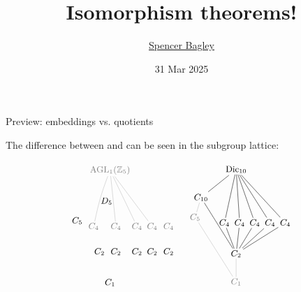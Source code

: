 \documentclass[8pt, handout]{beamer}
\title[Isomorphism theorems!]{Isomorphism theorems!}
\author[\href{mailto:sbagley@westminsteru.edu}{S. Bagley}]
       {\href{mailto:sbagley@westminsteru.edu}{Spencer Bagley}}
\institute[Westminster] { 
  \normalsize With many thanks to Matthew Macauley, \\
  \url{http://www.math.clemson.edu/~macaule/}}
\date[31 Mar 2025]{31 Mar 2025}
\newcommand{\Pause}{}      %
\begin{document}
\frame{\titlepage}


\begin{frame}{Preview: embeddings vs. quotients} %

  The difference between  and  can be seen in the subgroup lattice:
  
  \vspace{-2mm}

  \[
  \begin{tikzpicture}[shorten >= -2pt, shorten <= -2pt,scale=.65]
    \tikzstyle{every node}=[font=\small]
    \begin{scope}[shift={(7,1.6)},scale=1.3,yscale=1.2]
      \node(Dic10) at (0,3) {$\Dic_{10}$};
      \node(r) at (-1.5,2) {$C_{10}$};
      \node(s) at (-.5,1.1) {$C_4$}; 
      \node(rs) at (.15,1.1) {$C_4$}; 
      \node(r2s) at (.8,1.1) {$C_4$}; 
      \node(r3s) at (1.45,1.1) {$C_4$};
      \node(r4s) at (2.1,1.1) {$C_4$};
      \node (r5) at (0,0) {$C_2$};
      \node (r2) at (-1.75,1.3) {\color{midgray}$C_5$};
      \node (1) at (0,-1) {\color{midgray}$C_1$};
      \draw (Dic10) to (r); \draw (r) to (r5);
      \draw (Dic10) to (s); \draw (Dic10) to (rs); 
      \draw (Dic10) to (r2s); \draw (Dic10) to (r3s); \draw (Dic10) to (r4s);
      \draw (r5) to (s); \draw (r5) to (rs); \draw (r5) to (r2s);
      \draw (r5) to (r3s); \draw (r5) to (r4s);
      \draw[faded] (1) to (r5); \draw[faded] (1) to (r2); 
      \draw[faded] (r) to (r2); 
    \end{scope}
    \begin{scope}[shift={(0,0)},scale=1.3,yscale=1.2]
      \node (Fr20) at (0,4) {\color{midgray}$\AGL_1(\Z_5)$};
      \node(s2-t) at (-.15,2.9) {$D_5$};
      \node (t) at (-1.4,2.2) {$C_5$};
      \node (s) at (-.7,2) {\color{midgray}$C_4$};
      \node (st) at (.25,2) {\color{midgray}$C_4$};
      \node (s3t) at (1.15,2) {\color{midgray}$C_4$};
      \node (ts) at (1.8,2) {\color{midgray}$C_4$};
      \node (ts3) at (2.5,2) {\color{midgray}$C_4$};
      \node(s2) at (-.45,1.1) {$C_2$}; 
      \node(ts2) at (.25,1.1) {$C_2$}; 
      \node(sts) at (1.15,1.1) {$C_2$}; 
      \node(s2t2) at (1.8,1.1) {$C_2$};
      \node(s2t) at (2.5,1.1) {$C_2$};
      \node (1) at (0,0) {$C_1$};
      \draw[bend right=5,faded] (Fr20) to (s); 
      \draw[faded] (Fr20) to (st); 
      \draw[faded] (Fr20) to (s3t);
      \draw[faded] (Fr20) to (ts); 

\end{scope}
\end{tikzpicture}\]
\end{frame}
\end{document}
